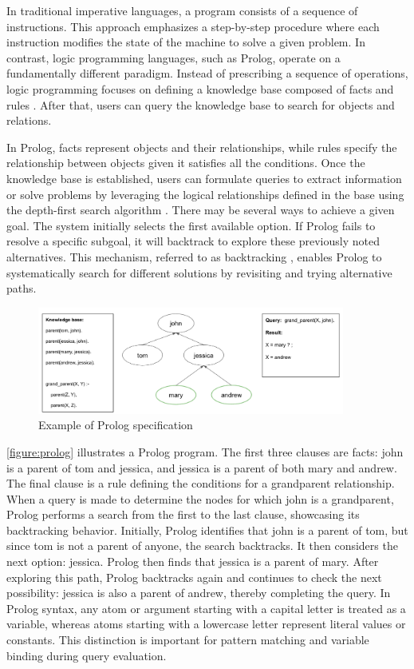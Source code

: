 In traditional imperative languages, a program consists of a sequence of instructions.
This approach emphasizes a step-by-step procedure where each instruction modifies the state of the machine to solve a given problem. 
In contrast, logic programming languages, such as Prolog, operate on a fundamentally different paradigm. 
Instead of prescribing a sequence of operations, logic programming focuses on defining a knowledge base composed of facts and rules \cite{Bramer2013}. After that, users can query the knowledge base to search for objects and relations. 

In Prolog, facts represent objects and their relationships, while rules specify the relationship between objects given it satisfies all the conditions. Once the knowledge base is established, users can formulate queries to extract information or solve problems by leveraging the logical relationships defined in the base using the depth-first search algorithm \cite{Chowdhary2020}. There may be several ways to achieve a given goal. The system initially selects the first available option. If Prolog fails to resolve a specific subgoal, it will backtrack to explore these previously noted alternatives. This mechanism, referred to as backtracking \cite{Chowdhary2020}, enables Prolog to systematically search for different solutions by revisiting and trying alternative paths.

\begin{figure}[h]
    \centering
    \includegraphics[width=0.9\textwidth]{Packages/Prolog.png}
    \caption{Example of Prolog specification}
    \label{figure:prolog}
\end{figure}

\autoref{figure:prolog} illustrates a Prolog program. The first three clauses are facts: john is a parent of tom and jessica, and jessica is a parent of both mary and andrew. The final clause is a rule defining the conditions for a grandparent relationship. When a query is made to determine the nodes for which john is a grandparent, Prolog performs a search from the first to the last clause, showcasing its backtracking behavior. Initially, Prolog identifies that john is a parent of tom, but since tom is not a parent of anyone, the search backtracks. It then considers the next option: jessica. Prolog then finds that jessica is a parent of mary. After exploring this path, Prolog backtracks again and continues to check the next possibility: jessica is also a parent of andrew, thereby completing the query.
In Prolog syntax, any atom or argument starting with a capital letter is treated as a variable, whereas atoms starting with a lowercase letter represent literal values or constants. This distinction is important for pattern matching and variable binding during query evaluation.
